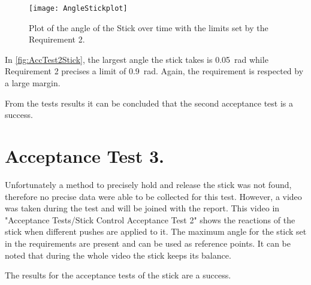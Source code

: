 \begin{figure} [htbp]
	\centering
	\texttt{[image: AngleStickplot]}
	\caption{Plot of the angle of the Stick over time with the limits set by the Requirement 2.}
	\label{fig:AccTest2Stick}
\end{figure}

In \autoref{fig:AccTest2Stick}, the largest angle the stick takes is \SI{0.05}{\radian} while Requirement 2 precises a limit of \SI{0.9}{\radian}. Again, the requirement is respected by a large margin.

From the tests results it can be concluded that the second acceptance test is a success.

\section{Acceptance Test 3.}

Unfortunately a method to precisely hold and release the stick was not found, therefore no precise data were able to be collected for this test. However, a video was taken during the test and will be joined with the report. This video in "Acceptance Tests/Stick Control Acceptance Test 2" shows the reactions of the stick when different pushes are applied to it. The maximum angle for the stick set in the requirements are present and can be used as reference points. It can be noted that during the whole video the stick keeps its balance.

The results for the acceptance tests of the stick are a success.